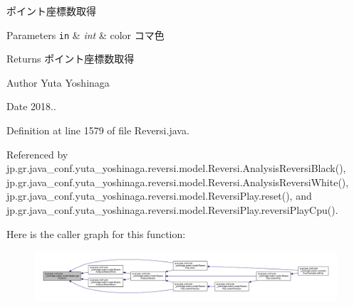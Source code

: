 ポイント座標数取得 


\begin{DoxyParams}[1]{Parameters}
\mbox{\tt in}  & {\em int} & color コマ色 \\
\hline
\end{DoxyParams}
\begin{DoxyReturn}{Returns}
ポイント座標数取得 
\end{DoxyReturn}
\begin{DoxyAuthor}{Author}
Yuta Yoshinaga 
\end{DoxyAuthor}
\begin{DoxyDate}{Date}
2018.. 
\end{DoxyDate}


Definition at line 1579 of file Reversi.\+java.



Referenced by jp.\+gr.\+java\+\_\+conf.\+yuta\+\_\+yoshinaga.\+reversi.\+model.\+Reversi.\+Analysis\+Reversi\+Black(), jp.\+gr.\+java\+\_\+conf.\+yuta\+\_\+yoshinaga.\+reversi.\+model.\+Reversi.\+Analysis\+Reversi\+White(), jp.\+gr.\+java\+\_\+conf.\+yuta\+\_\+yoshinaga.\+reversi.\+model.\+Reversi\+Play.\+reset(), and jp.\+gr.\+java\+\_\+conf.\+yuta\+\_\+yoshinaga.\+reversi.\+model.\+Reversi\+Play.\+reversi\+Play\+Cpu().

Here is the caller graph for this function\+:
\nopagebreak
\begin{figure}[H]
\begin{center}
\leavevmode
\includegraphics[width=350pt]{classjp_1_1gr_1_1java__conf_1_1yuta__yoshinaga_1_1reversi_1_1model_1_1_reversi_a8ab289d67a725a30e92411c90b755bd8_icgraph}
\end{center}
\end{figure}
\mbox{\label{classjp_1_1gr_1_1java__conf_1_1yuta__yoshinaga_1_1reversi_1_1model_1_1_reversi_a9929ed36140ddc25923ede99f86564c3}} 
